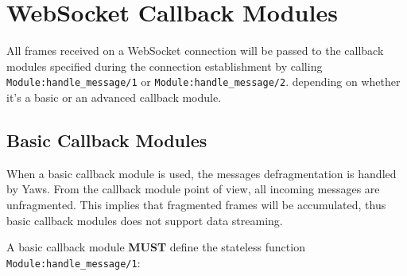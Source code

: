 \documentclass[11pt,oneside,english]{book}
\newcommand{\Yaws}            %
        {{\sc Yaws}}
\begin{document}
\section{WebSocket Callback Modules}


All frames received on a WebSocket connection will be passed to the callback
modules specified during the connection establishment by calling
\verb+Module:handle_message/1+ or \verb+Module:handle_message/2+.  depending on
whether it's a basic or an advanced callback module.


\subsection{Basic Callback Modules}

When a basic callback module is used, the messages defragmentation is handled by
\Yaws. From the callback module point of view, all incoming messages are
unfragmented. This implies that fragmented frames will be accumulated, thus
basic callback modules does not support data streaming.

A basic callback module \textbf{MUST} define the stateless function
\verb+Module:handle_message/1+:
\end{document}
